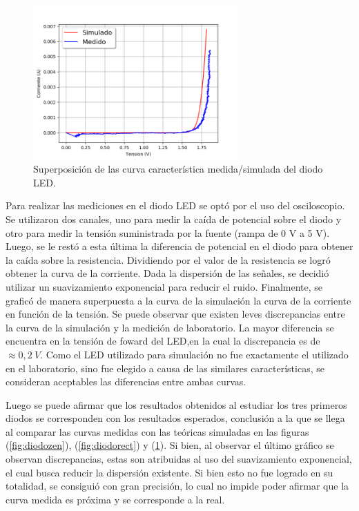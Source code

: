 \documentclass[a4paper]{article}
\begin{document}
\begin{figure}[H]
	\centering
	\includegraphics[width=0.7\textwidth]{CurvaDiodosLed.png}
	\caption{Superposición de las curva característica medida/simulada del diodo LED.}
	\label{fig:diodoled}
\end{figure}

Para realizar las mediciones en el diodo LED se optó por el uso del osciloscopio. Se utilizaron dos canales, uno para medir la caída de potencial sobre el diodo y otro para medir la tensión suministrada por la fuente (rampa de 0 V a 5 V). Luego, se le restó a esta última la diferencia de potencial en el diodo para obtener la caída sobre la resistencia. Dividiendo por el valor de la resistencia se logró obtener la curva de la corriente. Dada la dispersión de las señales, se decidió utilizar un suavizamiento exponencial para reducir el ruido. Finalmente, se graficó de manera superpuesta a la curva de la simulación la curva de la corriente en función de la tensión.
Se puede observar que existen leves discrepancias entre la curva de la simulación y la medición de laboratorio. La mayor diferencia se encuentra en la tensión de foward del LED,en  la cual la discrepancia es de $\approx 0,2 \ V$.
Como el LED utilizado para simulación no fue exactamente el utilizado en el laboratorio, sino fue elegido a causa de las similares características, se consideran aceptables las diferencias entre ambas curvas.

Luego se puede afirmar que los resultados obtenidos al estudiar los tres primeros diodos se corresponden con los resultados esperados, conclusión a la que se llega al comparar las curvas medidas con las teóricas simuladas en las figuras (\ref{fig:diodozen}), (\ref{fig:diodorect}) y (\ref{fig:diodoled}). Si bien, al observar el último gráfico se observan discrepancias, estas son atribuidas al uso del suavizamiento exponencial, el cual busca reducir la dispersión existente. Si bien esto no fue logrado en su totalidad, se consiguió con gran precisión, lo cual no impide poder afirmar que la curva medida es próxima y se corresponde a la real.
\end{document}
